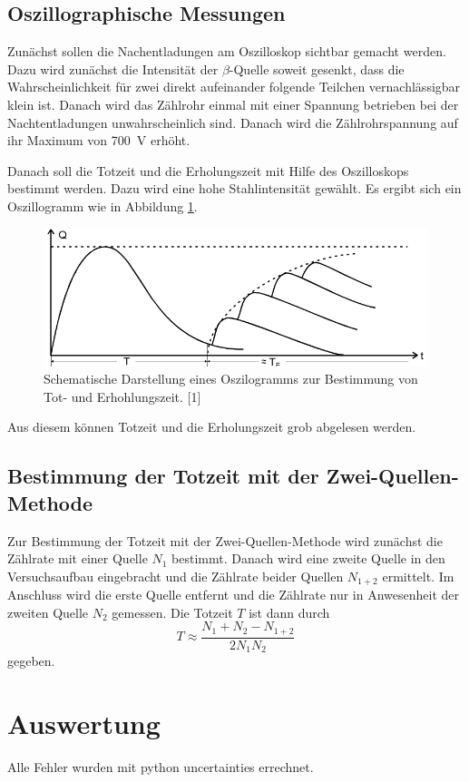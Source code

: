 \documentclass[11pt,ngerman,a4paper]{article}
\begin{document}
\subsection{Oszillographische Messungen}
Zunächst sollen die Nachentladungen am Oszilloskop sichtbar gemacht werden. Dazu wird zunächst die Intensität der $\beta$-Quelle soweit gesenkt, dass die Wahrscheinlichkeit für zwei direkt aufeinander folgende Teilchen vernachlässigbar klein ist. Danach wird das Zählrohr einmal mit einer Spannung betrieben bei der Nachtentladungen unwahrscheinlich sind. Danach wird die Zählrohrspannung auf ihr Maximum von \SI{700}{\volt} erhöht.

\noindent
Danach soll die Totzeit und die Erholungszeit mit Hilfe des Oszilloskops bestimmt werden. Dazu wird eine hohe Stahlintensität gewählt. Es ergibt sich ein Oszillogramm wie in Abbildung \ref{abb5}.
\begin{figure}[htp]
\centering
\includegraphics[scale=0.55]{abb5.png}
\caption{Schematische Darstellung eines Oszilogramms zur Bestimmung von Tot- und Erhohlungszeit. [1]}
\label{abb5}
\end{figure}
Aus diesem können Totzeit und die Erholungszeit grob abgelesen werden.
\subsection{Bestimmung der Totzeit mit der Zwei-Quellen-Methode}
Zur Bestimmung der Totzeit mit der Zwei-Quellen-Methode wird zunächst die Zählrate mit einer Quelle $N_1$ bestimmt. Danach wird eine zweite Quelle in den Versuchsaufbau eingebracht und die Zählrate beider Quellen $N_{1+2}$ ermittelt. Im Anschluss wird die erste Quelle entfernt und die Zählrate nur in Anwesenheit der zweiten Quelle $N_2$ gemessen. Die Totzeit $T$ ist dann durch 
\[
T \approx \frac{N_1 + N_2 - N_{1+2}}{2N_1N_2}
\]
gegeben.
 
\section{Auswertung}
Alle Fehler wurden mit python uncertainties errechnet.
\end{document}
